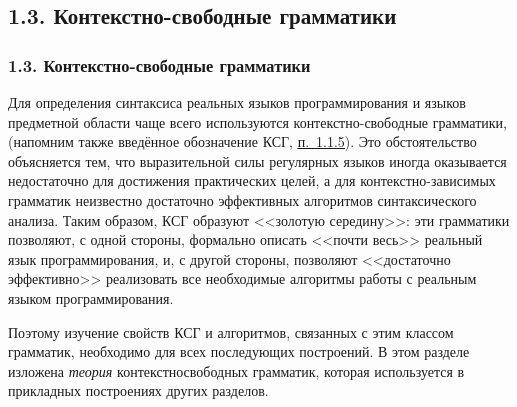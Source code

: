 \documentclass[mathserif,12pt,aspectratio=169]{beamer}
\def\emразделенной{\em разделенной}
\def\em#1{\it\color{blue}#1}
\def\DMref#1#2{{\color{blue}\underline{\hyperlink{#2}{#1}}}}
\begin{document}
\subsection{1.3. Контекстно-свободные грамматики}\label{1.3.}
\begin{frame}
\frametitle{1.3. Контекстно-свободные грамматики}

Для определения синтаксиса реальных
языков программирования и 
языков предметной области 
чаще всего используются
контекстно-свободные грамматики, (напомним
также введённое обозначение КСГ, \DMref{п.~1.1.5}{1.1.5.}). 
Это обстоятельство объясняется тем,
что выразительной силы регулярных языков иногда оказывается
недостаточно для достижения 
практических целей, а для 
контекстно-зависимых грамматик 
неизвестно достаточно эффективных алгоритмов 
синтаксического анализа.
Таким образом,
КСГ образуют <<золотую середину>>:
эти грамматики позволяют, 
с одной стороны,
формально описать <<почти весь>> 
реальный язык программирования,
и, с другой стороны,
позволяют <<достаточно эффективно>>
реализовать все необходимые 
алгоритмы работы с реальным языком программирования.

\medskip  
Поэтому изучение свойств КСГ 
и алгоритмов, связанных с этим
классом грамматик, необходимо 
для всех последующих построений. 
В этом разделе изложена {\em теория}
 контекстно\-свободных грамматик, 
которая используется в прикладных 
построениях других разделов. 
\end{frame}
\end{document}
